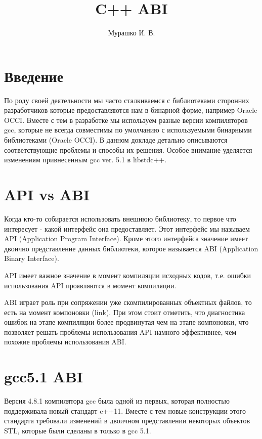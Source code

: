 \documentclass[14pt,a4paper]{article}
\title{C++ ABI}
\author{Мурашко И. В.}
\date{}
\begin{document}
\Russian

\maketitle

\section*{Введение}
По роду своей деятельности мы часто сталкиваемся с библиотеками сторонних 
разработчиков которые предоставляются нам в бинарной форме, например 
Oracle OCCI. Вместе с тем в разработке мы используем разные версии 
компиляторов gcc, которые не всегда совместимы по умолчанию с
используемыми бинарными библиотеками (Oracle OCCI). 
В данном докладе детально описываются соответствующие проблемы и способы 
их решения. Особое внимание уделяется изменениям привнесенным gcc ver.
5.1 в libstdc++.

\section{API vs ABI}

Когда кто-то собирается использовать внешнюю библиотеку, то первое что
интересует - какой интерфейс она предоставляет. Этот интерфейс мы
называем API (Application Program Interface). Кроме этого
интерфейса значение имеет двоично представление данных библиотеки,
которое называется ABI (Application Binary Interface).

API имеет важное значение в момент компиляции исходных кодов, т.е.
ошибки использования API проявляются в момент компиляции.

ABI играет роль при сопряжении уже скомпилированных объектных файлов,
то есть на момент компоновки (link). При этом стоит отметить, что
диагностика ошибок на этапе компиляции более продвинутая чем на этапе
компоновки, что позволяет решать проблемы использования API намного
эффективнее, чем похожие проблемы использования ABI. 


\section{gcc5.1 ABI}

Версия 4.8.1 компилятора gcc была одной из первых, которая полностью
поддерживала новый стандарт c++11. Вместе с тем новые конструкции
этого стандарта требовали изменений в двоичном представлении некоторых
объектов STL, которые были сделаны в только в gcc 5.1.
\end{document}
